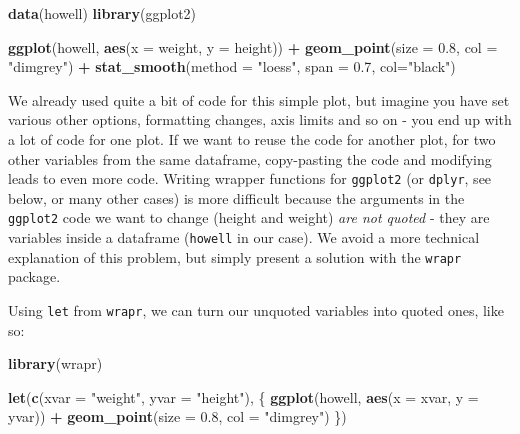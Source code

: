 \documentclass[]{book}
\newenvironment{Shaded}{\begin{snugshade}}{\end{snugshade}}
\newcommand{\DataTypeTok}[1]{\textcolor[rgb]{0.13,0.29,0.53}{#1}}
\newcommand{\FloatTok}[1]{\textcolor[rgb]{0.00,0.00,0.81}{#1}}
\newcommand{\KeywordTok}[1]{\textcolor[rgb]{0.13,0.29,0.53}{\textbf{#1}}}
\newcommand{\NormalTok}[1]{#1}
\newcommand{\OperatorTok}[1]{\textcolor[rgb]{0.81,0.36,0.00}{\textbf{#1}}}
\newcommand{\StringTok}[1]{\textcolor[rgb]{0.31,0.60,0.02}{#1}}
\begin{document}
\begin{Shaded}
\begin{Highlighting}[]
\KeywordTok{data}\NormalTok{(howell)}
\KeywordTok{library}\NormalTok{(ggplot2)}

\KeywordTok{ggplot}\NormalTok{(howell, }\KeywordTok{aes}\NormalTok{(}\DataTypeTok{x =}\NormalTok{ weight, }\DataTypeTok{y =}\NormalTok{ height)) }\OperatorTok{+}
\StringTok{  }\KeywordTok{geom_point}\NormalTok{(}\DataTypeTok{size =} \FloatTok{0.8}\NormalTok{, }\DataTypeTok{col =} \StringTok{"dimgrey"}\NormalTok{) }\OperatorTok{+}
\StringTok{  }\KeywordTok{stat_smooth}\NormalTok{(}\DataTypeTok{method =} \StringTok{"loess"}\NormalTok{, }\DataTypeTok{span =} \FloatTok{0.7}\NormalTok{, }\DataTypeTok{col=}\StringTok{"black"}\NormalTok{)}
\end{Highlighting}
\end{Shaded}

We already used quite a bit of code for this simple plot, but imagine you have set various other options, formatting changes, axis limits and so on - you end up with a lot of code for one plot. If we want to reuse the code for another plot, for two other variables from the same dataframe, copy-pasting the code and modifying leads to even more code. Writing wrapper functions for \texttt{ggplot2} (or \texttt{dplyr}, see below, or many other cases) is more difficult because the arguments in the \texttt{ggplot2} code we want to change (height and weight) \emph{are not quoted} - they are variables inside a dataframe (\texttt{howell} in our case). We avoid a more technical explanation of this problem, but simply present a solution with the \texttt{wrapr} package.

Using \texttt{let} from \texttt{wrapr}, we can turn our unquoted variables into quoted ones, like so:

\begin{Shaded}
\begin{Highlighting}[]
\KeywordTok{library}\NormalTok{(wrapr)}

\KeywordTok{let}\NormalTok{(}\KeywordTok{c}\NormalTok{(}\DataTypeTok{xvar =} \StringTok{"weight"}\NormalTok{, }\DataTypeTok{yvar =} \StringTok{"height"}\NormalTok{), \{}
  \KeywordTok{ggplot}\NormalTok{(howell, }\KeywordTok{aes}\NormalTok{(}\DataTypeTok{x =}\NormalTok{ xvar, }\DataTypeTok{y =}\NormalTok{ yvar)) }\OperatorTok{+}
\StringTok{  }\KeywordTok{geom_point}\NormalTok{(}\DataTypeTok{size =} \FloatTok{0.8}\NormalTok{, }\DataTypeTok{col =} \StringTok{"dimgrey"}\NormalTok{)}
\NormalTok{\})}
\end{Highlighting}
\end{Shaded}
\end{document}
